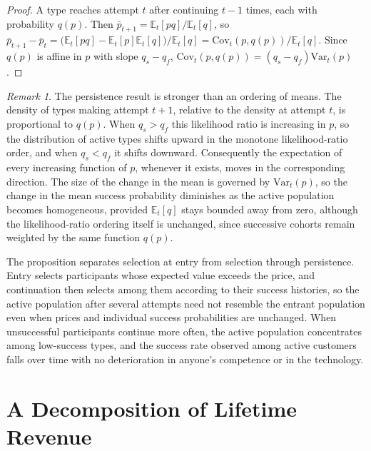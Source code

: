 \documentclass[11pt]{article}
\theoremstyle{remark}
\newtheorem{remark}{Remark}
\newcommand{\E}{\mathbb{E}}
\begin{document}
\begin{proof}
A type reaches attempt $t$ after continuing $t-1$ times, each with probability $q(p)$. Then $\bar p_{t+1}=\E_t[pq]/\E_t[q]$, so $\bar p_{t+1}-\bar p_t=\bigl(\E_t[pq]-\E_t[p]\E_t[q]\bigr)/\E_t[q]=\mathrm{Cov}_t(p,q(p))/\E_t[q]$. Since $q(p)$ is affine in $p$ with slope $q_s-q_f$, $\mathrm{Cov}_t(p,q(p))=(q_s-q_f)\mathrm{Var}_t(p)$.
\end{proof}

\begin{remark}\label{rem:mlr}
The persistence result is stronger than an ordering of means. The density of types making attempt $t+1$, relative to the density at attempt $t$, is proportional to $q(p)$. When $q_s>q_f$ this likelihood ratio is increasing in $p$, so the distribution of active types shifts upward in the monotone likelihood-ratio order, and when $q_s<q_f$ it shifts downward. Consequently the expectation of every increasing function of $p$, whenever it exists, moves in the corresponding direction. The size of the change in the mean is governed by $\mathrm{Var}_t(p)$, so the change in the mean success probability diminishes as the active population becomes homogeneous, provided $\E_t[q]$ stays bounded away from zero, although the likelihood-ratio ordering itself is unchanged, since successive cohorts remain weighted by the same function $q(p)$.
\end{remark}

The proposition separates selection at entry from selection through persistence. Entry selects participants whose expected value exceeds the price, and continuation then selects among them according to their success histories, so the active population after several attempts need not resemble the entrant population even when prices and individual success probabilities are unchanged. When unsuccessful participants continue more often, the active population concentrates among low-success types, and the success rate observed among active customers falls over time with no deterioration in anyone's competence or in the technology.

\section{A Decomposition of Lifetime Revenue}\label{sec:decomp}
\end{document}

